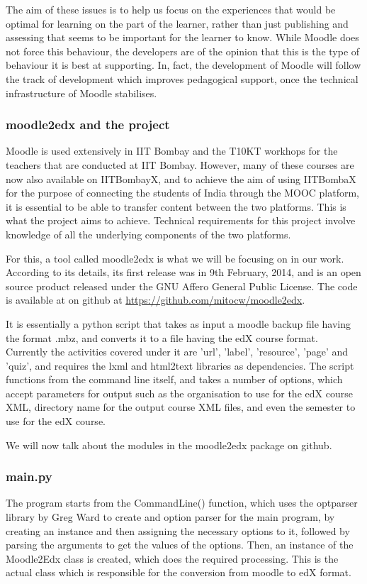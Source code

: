\documentclass[14pt]{article}
\begin{document}
The aim of these issues is to help us focus on the experiences that would be optimal for learning on the part of the learner, rather than just publishing and assessing that seems to be important for the learner to know. While Moodle does not force this behaviour, the developers are of the opinion that this is the type of behaviour it is best at supporting. In, fact, the development of Moodle will follow the track of development which improves pedagogical support, once the technical infrastructure of Moodle stabilises.

\subsubsection{moodle2edx and the project}

Moodle is used extensively in IIT Bombay and the T10KT workhops for the teachers that are conducted at IIT Bombay. However, many of these courses are now also available on IITBombayX, and to achieve the aim of using IITBombaX for the purpose of connecting the students of India through the MOOC platform, it is essential to be able to transfer content between the two platforms. This is what the project aims to achieve. Technical requirements for this project involve knowledge of all the underlying components of the two platforms.

For this, a tool called moodle2edx is what we will be focusing on in our work. According to its details, its first release was in 9th February, 2014, and is an open source product released under the GNU Affero General Public License. The code is available at on github at \url{https://github.com/mitocw/moodle2edx}.

It is essentially a python script that takes as input a moodle backup file having the format .mbz, and converts it to a file having the edX course format. Currently the activities covered under it are 'url', 'label', 'resource', 'page' and 'quiz', and requires the lxml and html2text libraries as dependencies. The script functions from the command line itself, and takes a number of options, which accept parameters for output such as the organisation to use for the edX course XML, directory name for the output course XML files, and even the semester to use for the edX course.

We will now talk about the modules in the moodle2edx package on github.

\subsubsection{main.py}
The program starts from the CommandLine() function, which uses the optparser library by Greg Ward to create and option parser for the main program, by creating an instance and then assigning the necessary options to it, followed by parsing the arguments to get the values of the options. Then, an instance of the Moodle2Edx class is created, which does the required processing. This is the actual class which is responsible for the conversion from moodle to edX format.
\end{document}
